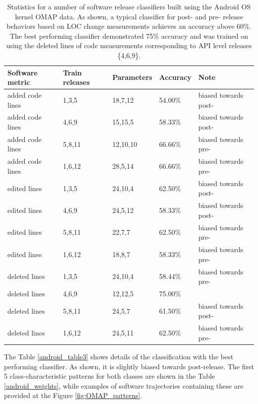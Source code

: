 \begin{table}
\begin{tabularx}{\linewidth}{l X X X l}
\toprule
Software metric & Train releases  & Parameters      & Accuracy        & Note\\
\midrule
added code lines &       1,3,5 &  18,7,12& 54.00\% & biased towards post-\\
added code lines &        4,6,9 &  15,15,5 &58.33\% & biased towards post-\\
added code lines &      5,8,11 & 12,10,10 &       66.66\% & biased towards pre-\\
added code lines &       1,6,12 & 28,5,14& 66.66\% & biased towards pre-\\
edited lines &   1,3,5  & 24,10,4& 62.50\%& biased towards post-\\
edited lines &   4,6,9  & 24,5,12& 58.33\% & biased towards post-\\
edited lines &   5,8,11&  22,7,7 & 62.50\%  &biased towards pre-\\
edited lines &   1,6,12 & 18,8,7 & 58.33\% & biased towards pre-\\
deleted lines &  1,3,5  & 24,10,4& 58.44\% & biased towards pre-\\
deleted lines &  4,6,9  & 12,12,5 &75.00\%  & \\
deleted lines &  5,8,11&  24,5,7 & 61.50\% & biased towards post-\\
deleted lines &  1,6,12 & 24,5,11 &62.50\% & biased towards pre-\\
\bottomrule
\end{tabularx}
\caption{Statistics for a number of software release classifiers built using the Android OS kernel OMAP data. As shown, a typical classifier for post- and pre- release behaviors based on LOC change measurements achieves an accuracy above 60\%. The best performing classifier demonstrated 75\% accuracy and was trained on using the deleted lines of code measurements corresponding to API level releases \{4,6,9\}.}
\label{android_accuracy}
\end{table}

The Table \ref{android_table3} shows details of the classification with the best performing classifier. As shown, it is slightly biased towards post-release. The first 5 class-characteristic patterns for both classes are shown in the Table \ref{android_weights}, while examples of software trajectories containing these are provided at the Figure \ref{fig:OMAP_patterns}.

